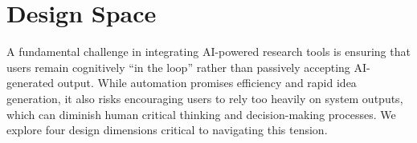 \section{Design Space}
\label{sec:design-space}


A fundamental challenge in integrating AI-powered research tools is ensuring that users remain cognitively ``in the loop'' rather than passively accepting AI-generated output. While automation promises efficiency and rapid idea generation, it also risks encouraging users to rely too heavily on system outputs, which can diminish human critical thinking and decision-making processes. We explore four design dimensions critical to navigating this tension.





